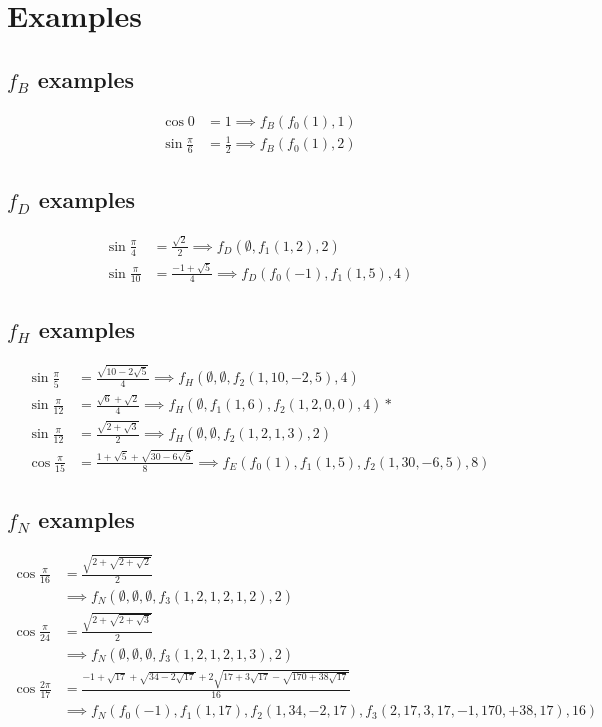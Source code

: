 \documentclass{article}
\begin{document}
\section{Examples}

\subsection{$f_B$ examples}
\begin{align}
\cos{0}             &= 1           \implies f_B(f_0(1),1)\\
\sin{\frac{\pi}{6}} &= \frac{1}{2} \implies f_B(f_0(1),2)
\end{align}

\subsection{$f_D$ examples}
\begin{align}
\sin{\frac{\pi}{4}}  &= \frac{\sqrt{2}}{2}    \implies f_D(\emptyset,f_1(1,2),2)\\
\sin{\frac{\pi}{10}} &= \frac{-1+\sqrt{5}}{4} \implies f_D(f_0(-1),f_1(1,5),4)
\end{align}

\subsection{$f_H$ examples}
\begin{align}
\sin{\frac{\pi}{5}}  &= \frac{\sqrt{10-2\sqrt{5}}}{4} \implies f_H(\emptyset,\emptyset,f_2(1,10,-2,5),4)\\
\sin{\frac{\pi}{12}} &= \frac{\sqrt{6} + \sqrt{2}}{4} \implies f_H(\emptyset,f_1(1,6),f_2(1,2,0,0),4) *\\
\sin{\frac{\pi}{12}} &= \frac{\sqrt{2 + \sqrt{3}}}{2} \implies f_H(\emptyset,\emptyset,f_2(1,2,1,3),2)\\
\cos{\frac{\pi}{15}} &= \frac{1+\sqrt{5}+\sqrt{30-6\sqrt{5}}}{8} \implies f_E(f_0(1),f_1(1,5),f_2(1,30,-6,5),8)
\end{align}

\subsection{$f_N$ examples}
\begin{align}
\cos{\frac{\pi}{16}} &= \frac{\sqrt{2+\sqrt{2+\sqrt{2}}}}{2}
  \\&\implies f_N(\emptyset,\emptyset,\emptyset,f_3(1,2,1,2,1,2),2) \nonumber \\
\cos{\frac{\pi}{24}} &= \frac{\sqrt{2+\sqrt{2+\sqrt{3}}}}{2}
  \\&\implies f_N(\emptyset,\emptyset,\emptyset,f_3(1,2,1,2,1,3),2) \nonumber \\
\cos{\frac{2\pi}{17}} &=
\frac{-1+\sqrt{17}+\sqrt{34-2\sqrt{17}}+2\sqrt{17+3\sqrt{17}-\sqrt{170+38\sqrt{17}}}}{16}
    \\&\implies f_N(f_0(-1),f_1(1,17),f_2(1,34,-2,17),f_3(2,17,3,17,-1,170,+38,17),16) \nonumber \\
\end{align}
\end{document}
